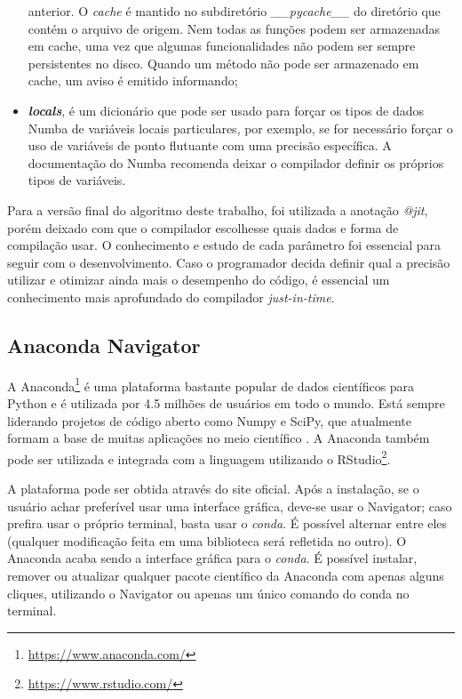 \documentclass[
	12pt,				%
	twoside,			%
	a4paper,			%
	english,			%
	french,				%
	spanish,			%
	brazil				%
	]{abntex2}
\begin{document}
\begin{itemize}
  anterior. O \emph{cache} é mantido no subdiretório
  \emph{\_\_pycache\_\_} do diretório que contém o arquivo de origem.
  Nem todas as funções podem ser armazenadas em cache, uma vez que
  algumas funcionalidades não podem ser sempre persistentes no disco.
  Quando um método não pode ser armazenado em cache, um aviso é emitido
  informando;
\item
  \textbf{\emph{locals}}, é um dicionário que pode ser usado para forçar
  os tipos de dados Numba de variáveis locais particulares, por exemplo,
  se for necessário forçar o uso de variáveis de ponto flutuante com uma
  precisão específica. A documentação do Numba recomenda deixar o
  compilador definir os próprios tipos de variáveis.
\end{itemize}

Para a versão final do algoritmo deste trabalho, foi utilizada a
anotação \emph{@jit}, porém deixado com que o compilador escolhesse
quais dados e forma de compilação usar. O conhecimento e estudo de cada
parâmetro foi essencial para seguir com o desenvolvimento. Caso o
programador decida definir qual a precisão utilizar e otimizar ainda
mais o desempenho do código, é essencial um conhecimento mais
aprofundado do compilador \emph{just-in-time}.

\subsection{Anaconda Navigator}\label{anaconda-navigator}

A Anaconda\footnote{\url{https://www.anaconda.com/}} é uma plataforma
bastante popular de dados científicos para Python e é utilizada por 4.5
milhões de usuários em todo o mundo. Está sempre liderando projetos de
código aberto como Numpy e SciPy, que atualmente formam a base de muitas
aplicações no meio científico \cite{ANACONDA}. A Anaconda também pode
ser utilizada e integrada com a linguagem utilizando o RStudio\footnote{\url{https://www.rstudio.com/}}.

A plataforma pode ser obtida através do site oficial. Após a instalação,
se o usuário achar preferível usar uma interface gráfica, deve-se usar o
Navigator; caso prefira usar o próprio terminal, basta usar o
\emph{conda}. É possível alternar entre eles (qualquer modificação feita
em uma biblioteca será refletida no outro). O Anaconda acaba sendo a
interface gráfica para o \emph{conda}. É possível instalar, remover ou
atualizar qualquer pacote científico da Anaconda com apenas alguns
cliques, utilizando o Navigator ou apenas um único comando do conda no
terminal.
\end{document}
